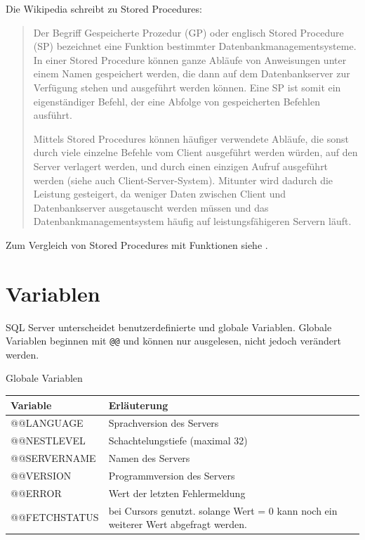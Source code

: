 \documentclass[12pt,ngerman,a4paper,index=totoc,twoside]{scrartcl}
\newcommand{\sql}[1]{\texttt{#1}}
\begin{document}
Die Wikipedia \cite{wikip:sp} schreibt zu Stored Procedures:

\begin{quote}
Der Begriff Gespeicherte Prozedur (GP) oder englisch Stored Procedure (SP) bezeichnet eine Funktion bestimmter Datenbankmanagementsysteme. In einer Stored Procedure können ganze Abläufe von Anweisungen unter einem Namen gespeichert werden, die dann auf dem Datenbankserver zur Verfügung stehen und ausgeführt werden können. Eine SP ist somit ein eigenständiger Befehl, der eine Abfolge von gespeicherten Befehlen ausführt.

Mittels Stored Procedures können häufiger verwendete Abläufe, die sonst durch viele einzelne Befehle vom Client ausgeführt werden würden, auf den Server verlagert werden, und durch einen einzigen Aufruf ausgeführt werden (siehe auch Client-Server-System). Mitunter wird dadurch die Leistung gesteigert, da weniger Daten zwischen Client und Datenbankserver ausgetauscht werden müssen und das Datenbankmanagementsystem häufig auf leistungsfähigeren Servern läuft.
\end{quote}

Zum Vergleich von Stored Procedures mit Funktionen siehe \cite{modi:2007}.

\section{Variablen}

SQL Server unterscheidet benutzerdefinierte und globale Variablen. Globale Variablen beginnen mit \sql{@@} und können nur ausgelesen, nicht jedoch verändert werden.  

\begin{center}
\captionsetup{type=table}
\caption{Globale Variablen}
\begin{tabular}{p{4cm}p{7cm}} \hline \hline 
Variable & Erläuterung \\ \hline 
@@LANGUAGE & Sprachversion des Servers \\
@@NESTLEVEL & Schachtelungstiefe (maximal 32) \\
@@SERVERNAME  & Namen des Servers \\
@@VERSION & Programmversion des Servers \\
@@ERROR & Wert der letzten Fehlermeldung \\
@@FETCHSTATUS & bei Cursors genutzt. solange Wert = 0 kann noch ein weiterer Wert abgefragt werden. \\ \hline \hline
\end{tabular}
\end{center}
\end{document}
